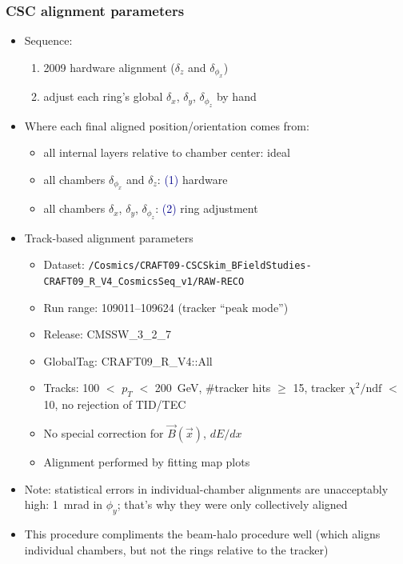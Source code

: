\documentclass[compress]{beamer}
\begin{document}
\begin{frame}
\frametitle{CSC alignment parameters}

\scriptsize
\begin{itemize}
\item \scriptsize Sequence:
\begin{enumerate}
\scriptsize \item \scriptsize 2009 hardware alignment ($\delta_z$ and $\delta_{\phi_x}$)
\item \scriptsize adjust each ring's global $\delta_x$, $\delta_y$, $\delta_{\phi_z}$ by hand
\end{enumerate}
\item \scriptsize Where each final aligned position/orientation comes from:
\begin{itemize}
\item \scriptsize all internal layers relative to chamber center: ideal
\item \scriptsize all chambers $\delta_{\phi_x}$ and $\delta_z$: \textcolor{darkblue}{(1)} hardware
\item \scriptsize all chambers $\delta_x$, $\delta_y$, $\delta_{\phi_z}$: \textcolor{darkblue}{(2)} ring adjustment
\end{itemize}
\item \scriptsize Track-based alignment parameters
\begin{itemize}
\item \scriptsize Dataset: \mbox{\tiny \tt /Cosmics/CRAFT09-CSCSkim\_BFieldStudies-CRAFT09\_R\_V4\_CosmicsSeq\_v1/RAW-RECO\hspace{-2 cm}}
\item \scriptsize Run range: 109011--109624 (tracker ``peak mode'')
\item \scriptsize Release: CMSSW\_3\_2\_7
\item \scriptsize GlobalTag: CRAFT09\_R\_V4::All
\item \scriptsize Tracks: 100 $<$ $p_T$ $<$ 200~GeV, \#tracker hits $\ge$ 15, tracker $\chi^2/\mbox{ndf}$ $<$ 10, no rejection of TID/TEC
\item \scriptsize No special correction for $\vec{B}(\vec{x})$, $dE/dx$
\item \scriptsize Alignment performed by fitting map plots
\end{itemize}
\end{itemize}

\vfill
\begin{itemize}
\item \scriptsize Note: statistical errors in individual-chamber alignments are unacceptably high: 1~mrad in $\phi_y$; that's why they were only collectively aligned
\item \scriptsize This procedure compliments the beam-halo procedure well (which aligns individual chambers, but not the rings relative to the tracker)
\end{itemize}
\end{frame}
\end{document}
